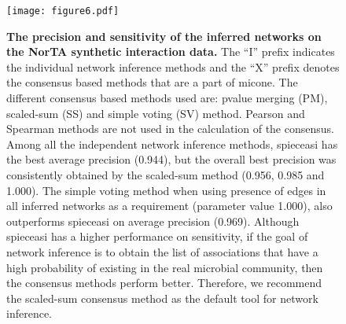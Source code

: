   \begin{figure}[H]
    \centering
    \texttt{[image: figure6.pdf]}
    \caption{
      \textbf{The precision and sensitivity of the inferred networks on the NorTA synthetic interaction data.}
      The ``I'' prefix indicates the individual network inference methods and the ``X'' prefix denotes the consensus based methods that are a part of \ac{micone}.
      The different consensus based methods used are: pvalue merging (PM), scaled-sum (SS) and simple voting (SV) method.
      Pearson and Spearman methods are not used in the calculation of the consensus.
      Among all the independent network inference methods, \ac{spieceasi} has the best average precision (0.944), but the overall best precision was consistently obtained by the scaled-sum method (0.956, 0.985 and 1.000).
      The simple voting method when using presence of edges in all inferred networks as a requirement (parameter value 1.000), also outperforms \ac{spieceasi} on average precision (0.969).
      Although \ac{spieceasi} has a higher performance on sensitivity, if the goal of network inference is to obtain the list of associations that have a high probability of existing in the real microbial community, then the consensus methods perform better.
      Therefore, we recommend the scaled-sum consensus method as the default tool for network inference.
    }
    \label{fig:figure6}
  \end{figure}
  \FloatBarrier
  \newpage

